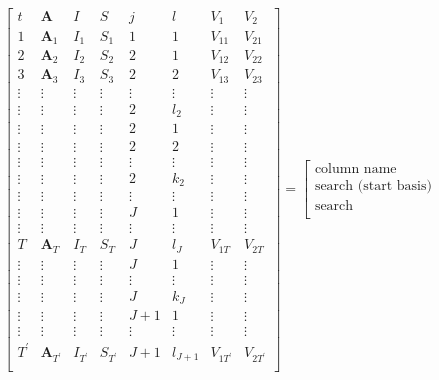 \documentclass[12pt]{article}
\begin{document}
\begin{equation}
\left[
\begin{array}{c|ccc|cc|cc}
t & \mathbf{A} & I & S & j &  l  & V_{1} & V_{2}\\
\hline
1 & \mathbf{A}_1 & I_1 & S_1 & 1 & 1 & V_{11} & V_{21}\\
\hline
2 & \mathbf{A}_2 & I_2 & S_2 & 2 & 1  & V_{12}  & V_{22}\\
3 & \mathbf{A}_3 & I_3 & S_3 & 2 & 2  & V_{13}  & V_{23}\\
\vdots & \vdots &\vdots &\vdots  &\vdots & \vdots &\vdots  &\vdots\\
\vdots & \vdots & \vdots &\vdots & 2 & l_2 & \vdots  & \vdots\\
\hline
\vdots &\vdots & \vdots &\vdots & 2  & 1& \vdots & \vdots\\
\vdots &\vdots &\vdots &\vdots & 2 & 2& \vdots &  \vdots\\
\vdots &\vdots &\vdots &\vdots &\vdots & \vdots & \vdots  &\vdots \\
\vdots &\vdots &\vdots &\vdots & 2 & k_2 &\vdots  & \vdots\\
\hline
\vdots &\vdots &\vdots &\vdots &\vdots & \vdots &\vdots &\vdots \\
\hline
\vdots & \vdots & \vdots &\vdots  & J &  1 & \vdots & \vdots \\
\vdots &\vdots &\vdots &\vdots &\vdots & \vdots &\vdots &\vdots \\
T & \mathbf{A}_T & I_T &S_T  & J &  l_{J} & V_{1T}& V_{2T}\\
\hline
\vdots &\vdots & \vdots &\vdots & J  & 1& \vdots & \vdots\\
\vdots &\vdots &\vdots &\vdots &\vdots & \vdots & \vdots  &\vdots \\
\vdots &\vdots &\vdots &\vdots & J & k_J &\vdots  & \vdots\\
\hline
\vdots& \vdots & \vdots & \vdots & J+1 & 1 & \vdots& \vdots\\
\vdots &\vdots &\vdots &\vdots &\vdots & \vdots &\vdots &\vdots \\
T^\prime & \mathbf{A}_{T^\prime} & I_{T^\prime} &S_{T^\prime}  & J+1 &  l_{J+1} & V_{1T^\prime}& V_{2T^\prime}\\
\end{array}
\right]
= 
\left[
\begin{array}{c}
\text{column name} \\
\hline
\text{search (start basis)} \\
\hline
\text{search} \\

\end{array}
\end{equation}
\end{document}
